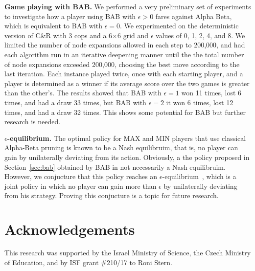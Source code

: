 \documentclass[runningheads]{llncs}
\newcounter{bab}
\begin{document}
\noindent \textbf{Game playing with BAB.} We performed a very preliminary set of experiments to investigate how a player using BAB with $\epsilon>0$ fares against Alpha Beta, which is equivalent to BAB with $\epsilon=0$.
We experimented on the deterministic version of C\&R with 3 cops and a 6$\times$6 grid and $\epsilon$ values of 0, 1, 2, 4, and 8. We limited the number of node expansions allowed in each step to 200,000, and had each algorithm run in an iterative deepening manner until the the total number of node expansions exceeded 200,000, choosing the  best move according to the last iteration.
Each instance played twice, once with each starting player, and a player is determined as a winner if its average score over the two games is greater than the other's.
The results showed that BAB with $\epsilon=1$ won 11 times, lost 6 times, and had a draw 33 times, but BAB with $\epsilon=2$ it won 6 times, lost 12 times, and had a draw 32 times.
This shows some potential for BAB but further research is needed. 

\noindent \textbf{$\epsilon$-equilibrium.} 
The optimal policy for MAX and MIN players that use classical Alpha-Beta pruning is known to be a Nash equilibruim, that is, no player can gain by unilaterally deviating from its action. Obviously, a the policy proposed in Section~\ref{sec:bab} obtained by BAB in not necessarily a Nash equilibruim. However, we conjucture that this policy reaches an  $\epsilon$-equilibrium~\citep{nisan2007algorithmic}, which is a joint policy in which no player can gain more than $\epsilon$ by unilaterally deviating from his strategy. Proving this conjucture is a topic for future research.





\section{Acknowledgements}
This research was supported by the Israel Ministry of Science, the Czech Ministry of Education, and by ISF grant \#210/17 to Roni Stern.




\end{document}
